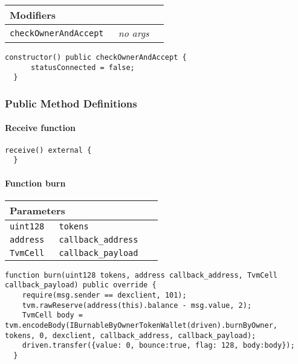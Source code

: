 \ifsoltables
\noindent\begin{tabular}{|l|l|p{5cm}|}\hline
\multicolumn{3}{|l|}{\bf Modifiers}\\\hline
\tt checkOwnerAndAccept & {\em no args} &\\\hline
\end{tabular}
\fi

\vspace{2cm}

\begin{lstlisting}[firstnumber=39]
  constructor() public checkOwnerAndAccept {
      statusConnected = false;
  }
\end{lstlisting}

\subsubsection{Public Method Definitions}


\paragraph{Receive function}

\vspace{2cm}

\begin{lstlisting}[firstnumber=129]
  receive() external {
  }
\end{lstlisting}

\paragraph{Function burn}


\ifsoltables
\noindent\begin{tabular}{|l|l|p{5cm}|}\hline
\multicolumn{3}{|l|}{\bf Parameters}\\\hline
\tt uint128 & \tt tokens &\\\hline
\tt address & \tt callback\_{}address &\\\hline
\tt TvmCell & \tt callback\_{}payload &\\\hline
\end{tabular}
\fi

\vspace{2cm}

\begin{lstlisting}[firstnumber=116]
  function burn(uint128 tokens, address callback_address, TvmCell callback_payload) public override {
    require(msg.sender == dexclient, 101);
    tvm.rawReserve(address(this).balance - msg.value, 2);
    TvmCell body = tvm.encodeBody(IBurnableByOwnerTokenWallet(driven).burnByOwner, tokens, 0, dexclient, callback_address, callback_payload);
    driven.transfer({value: 0, bounce:true, flag: 128, body:body});
  }
\end{lstlisting}

